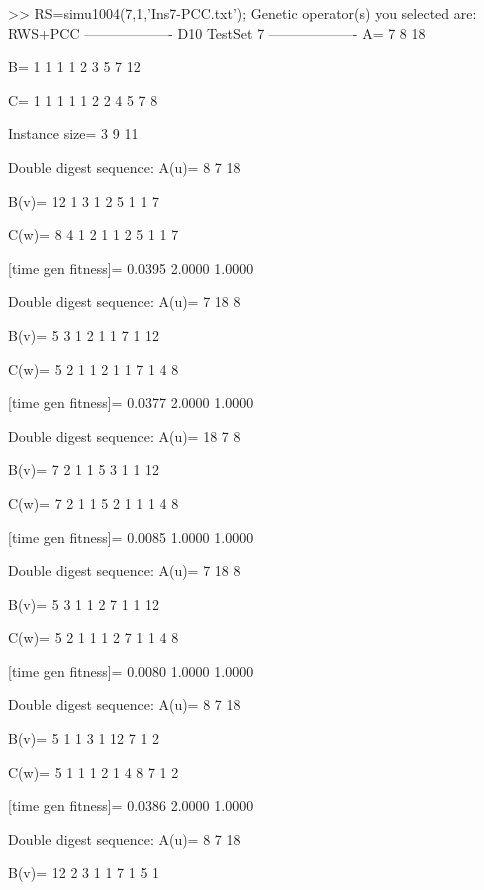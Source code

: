 >> RS=simu1004(7,1,'Ins7-PCC.txt');
Genetic operator(s) you selected are:
RWS+PCC
------------------- D10 TestSet 7 -------------------
A=
     7     8    18

B=
     1     1     1     1     2     3     5     7    12

C=
     1     1     1     1     1     2     2     4     5     7     8

Instance size=
     3     9    11

Double digest sequence:
A(u)=
     8     7    18

B(v)=
    12     1     3     1     2     5     1     1     7

C(w)=
     8     4     1     2     1     1     2     5     1     1     7

[time gen fitness]=
    0.0395    2.0000    1.0000

Double digest sequence:
A(u)=
     7    18     8

B(v)=
     5     3     1     2     1     1     7     1    12

C(w)=
     5     2     1     1     2     1     1     7     1     4     8

[time gen fitness]=
    0.0377    2.0000    1.0000

Double digest sequence:
A(u)=
    18     7     8

B(v)=
     7     2     1     1     5     3     1     1    12

C(w)=
     7     2     1     1     5     2     1     1     1     4     8

[time gen fitness]=
    0.0085    1.0000    1.0000

Double digest sequence:
A(u)=
     7    18     8

B(v)=
     5     3     1     1     2     7     1     1    12

C(w)=
     5     2     1     1     1     2     7     1     1     4     8

[time gen fitness]=
    0.0080    1.0000    1.0000

Double digest sequence:
A(u)=
     8     7    18

B(v)=
     5     1     1     3     1    12     7     1     2

C(w)=
     5     1     1     1     2     1     4     8     7     1     2

[time gen fitness]=
    0.0386    2.0000    1.0000

Double digest sequence:
A(u)=
     8     7    18

B(v)=
    12     2     3     1     1     7     1     5     1

